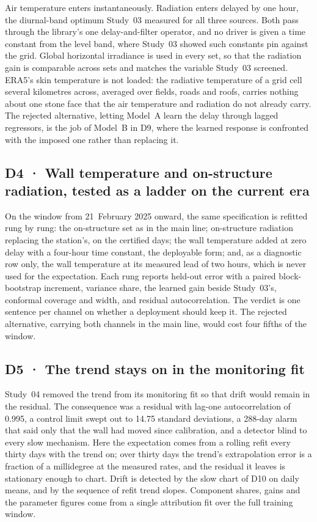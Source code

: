 \documentclass[11pt,a4paper]{article}
\begin{document}
Air temperature enters instantaneously. Radiation enters delayed by one hour,
the diurnal-band optimum Study~03 measured for all three sources. Both pass
through the library's one delay-and-filter operator, and no driver is given a
time constant from the level band, where Study~03 showed such constants pin
against the grid. Global horizontal irradiance is used in every set, so that
the radiation gain is comparable across sets and matches the variable
Study~03 screened. ERA5's skin temperature is not loaded: the radiative
temperature of a grid cell several kilometres across, averaged over fields,
roads and roofs, carries nothing about one stone face that the air temperature
and radiation do not already carry. The rejected alternative, letting Model~A
learn the delay through lagged regressors, is the job of Model~B in D9, where
the learned response is confronted with the imposed one rather than replacing
it.

\subsection{D4 · Wall temperature and on-structure radiation, tested as a ladder on the current era}

On the window from 21~February 2025 onward, the same specification is refitted
rung by rung: the on-structure set as in the main line; on-structure radiation
replacing the station's, on the certified days; the wall temperature added at
zero delay with a four-hour time constant, the deployable form; and, as a
diagnostic row only, the wall temperature at its measured lead of two hours,
which is never used for the expectation. Each rung reports held-out error with
a paired block-bootstrap increment, variance share, the learned gain beside
Study~03's, conformal coverage and width, and residual autocorrelation. The
verdict is one sentence per channel on whether a deployment should keep it.
The rejected alternative, carrying both channels in the main line, would cost
four fifths of the window.

\subsection{D5 · The trend stays on in the monitoring fit}

Study~04 removed the trend from its monitoring fit so that drift would remain
in the residual. The consequence was a residual with lag-one autocorrelation
of 0.995, a control limit swept out to 14.75 standard deviations, a 288-day
alarm that said only that the wall had moved since calibration, and a detector
blind to every slow mechanism. Here the expectation comes from a rolling refit
every thirty days with the trend on; over thirty days the trend's extrapolation
error is a fraction of a millidegree at the measured rates, and the residual it
leaves is stationary enough to chart. Drift is detected by the slow chart of
D10 on daily means, and by the sequence of refit trend slopes. Component shares,
gains and the parameter figures come from a single attribution fit over the
full training window.
\end{document}

